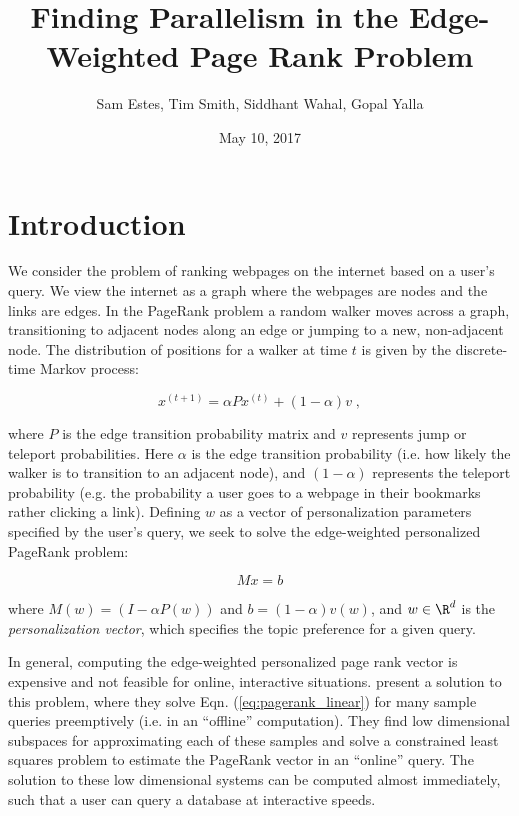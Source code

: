 \documentclass[11pt]{article}
\title{Finding Parallelism in the Edge-Weighted Page Rank Problem}
\author{Sam Estes, Tim Smith, Siddhant Wahal, Gopal Yalla}
\date{May 10, 2017}
\newcommand{\noi}{\noindent}
\begin{document}
\maketitle


\section{Introduction}

We consider the problem of ranking webpages on the internet based on a user's
query. We view the internet as a graph where the webpages are nodes and the
links are edges. 
In the PageRank problem a random walker moves across a graph, transitioning to
adjacent nodes along an edge or jumping to a new, non-adjacent node. The
distribution of positions for a walker at time $t$ is given by the discrete-time
Markov process: 

\begin{equation}
        x^{(t+1)}=\alpha P x^{(t)} + (1-\alpha) v \; ,
\label{eq:pagerank_markov}
\end{equation}

\noi where $P$ is the edge transition probability matrix and $v$ represents jump or
teleport probabilities. Here $\alpha$ is the edge
transition probability (i.e. how likely the walker is to transition to an
adjacent node), and $(1-\alpha)$ represents the teleport probability (e.g. the
probability a user goes to a webpage in their bookmarks rather clicking a link).
Defining $w$ as a vector of personalization parameters specified by the user's
query, we seek to solve the
edge-weighted personalized PageRank problem: 

\begin{equation}
        Mx=b
\label{eq:pagerank_linear}
\end{equation}

\noi where $M(w) = (I-\alpha P(w))$ and $b = (1-\alpha)v(w)$, and $w \in \R^d$ is
the \textit{personalization vector}, which specifies the topic preference for
a given query. 

In general, computing the edge-weighted personalized page rank vector is expensive
and not feasible for online, interactive situations. \cite{xie} present a
solution to this problem, where they solve Eqn. (\ref{eq:pagerank_linear}) for many
sample queries preemptively (i.e. in an ``offline'' computation). They find low
dimensional subspaces for
approximating each of these samples and solve a constrained least squares
problem to estimate the PageRank vector in an ``online'' query. The solution to
these low dimensional systems can be computed almost immediately, such that
a user can query a database at interactive speeds.   
\end{document}
